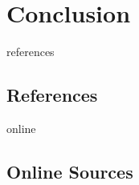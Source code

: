 \documentclass[12pt,a4paper]{report}
\begin{document}
\chapter{Conclusion} \label{chap:conclusion}




\newpage

\listoffigures
\newpage


\begin{btSect}{references}
\section*{References}
\btPrintCited
\end{btSect}
\begin{btSect}{online}
\section*{Online Sources}
\btPrintCited
\end{btSect}
\end{document}
